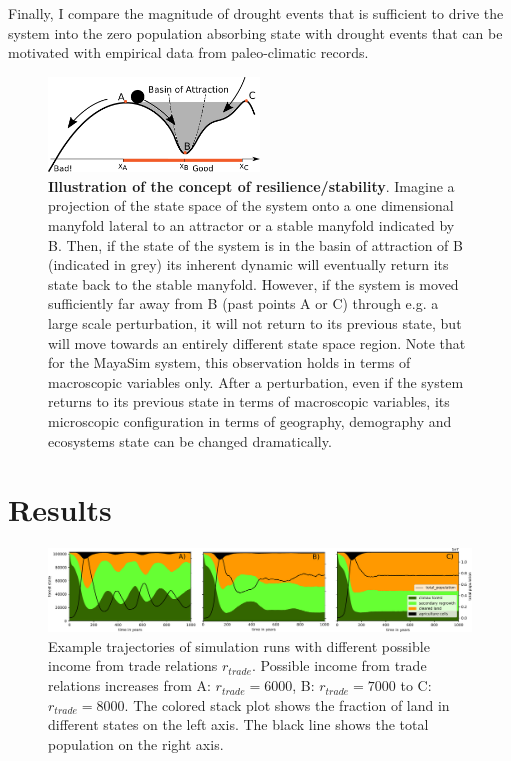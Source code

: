 Finally, I compare the magnitude of drought events that is sufficient to drive the system into the zero population absorbing state with drought events that can be motivated with empirical data from paleo-climatic records.

\begin{figure}[!t]
\centering
\includegraphics[width=0.5\textwidth]{figures/Basin_Stability.pdf}
\caption{\textbf{Illustration of the concept of resilience/stability}. Imagine a projection of the state space of the system onto a one dimensional manyfold lateral to an attractor or a stable manyfold indicated by B. Then, if the state of the system is in the basin of attraction of B (indicated in grey) its inherent dynamic will eventually return its state back to the stable manyfold. However, if the system is moved sufficiently far away from B (past points A or C) through e.g. a large scale perturbation, it will not return to its previous state, but will move towards an entirely different state space region. Note that for the MayaSim system, this observation holds in terms of macroscopic variables only. After a perturbation, even if the system returns to its previous state in terms of macroscopic variables, its microscopic configuration in terms of geography, demography and ecosystems state can be changed dramatically.}
\label{fig:basin_stability}
\end{figure}

\section{Results}
\begin{figure}[!t]
\centering
\includegraphics[width=\textwidth]{figures/trajectory.pdf}
\caption{Example trajectories of simulation runs with different possible income from trade relations $r_{trade}$. Possible income from trade relations increases from A: $r_{trade}=6000$, B: $r_{trade}=7000$ to C: $r_{trade}=8000$. The colored stack plot shows the fraction of land in different states on the left axis. The black line shows the total population on the right axis.}
\label{fig:trajectory}
\end{figure}

